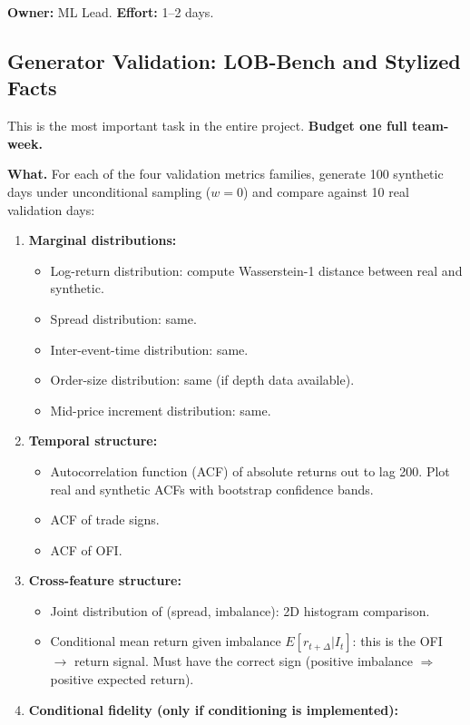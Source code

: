 \documentclass[11pt,a4paper]{article}
\begin{document}
\textbf{Owner:} ML Lead. \quad \textbf{Effort:} 1--2 days.

\subsection{Generator Validation: LOB-Bench and Stylized Facts}

This is the most important task in the entire project.  \textbf{Budget one full team-week.}

\textbf{What.}
For each of the four validation metrics families, generate 100 synthetic days under unconditional sampling ($w = 0$) and compare against 10 real validation days:

\begin{enumerate}[nosep]
  \item \textbf{Marginal distributions:}
    \begin{itemize}[nosep]
      \item Log-return distribution: compute Wasserstein-1 distance between real and synthetic.
      \item Spread distribution: same.
      \item Inter-event-time distribution: same.
      \item Order-size distribution: same (if depth data available).
      \item Mid-price increment distribution: same.
    \end{itemize}
  \item \textbf{Temporal structure:}
    \begin{itemize}[nosep]
      \item Autocorrelation function (ACF) of absolute returns out to lag 200.  Plot real and synthetic ACFs with bootstrap confidence bands.
      \item ACF of trade signs.
      \item ACF of OFI.
    \end{itemize}
  \item \textbf{Cross-feature structure:}
    \begin{itemize}[nosep]
      \item Joint distribution of (spread, imbalance): 2D histogram comparison.
      \item Conditional mean return given imbalance $E[r_{t+\Delta} | I_t]$: this is the OFI $\to$ return signal.  Must have the correct sign (positive imbalance $\Rightarrow$ positive expected return).
    \end{itemize}
  \item \textbf{Conditional fidelity (only if conditioning is implemented):}

\end{enumerate}
\end{document}
